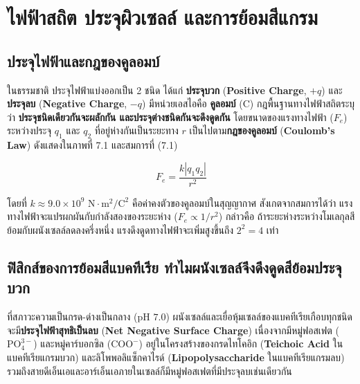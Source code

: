 \chapter{ไฟฟ้าสถิต ประจุผิวเซลล์ และการย้อมสีแกรม}

\section{ประจุไฟฟ้าและกฎของคูลอมบ์}


ในธรรมชาติ ประจุไฟฟ้าแบ่งออกเป็น 2 ชนิด ได้แก่ \textbf{ประจุบวก} (\textbf{Positive Charge}, $+q$) และ\textbf{ประจุลบ} (\textbf{Negative Charge}, $-q$) มีหน่วยเอสไอคือ \textbf{คูลอมบ์} ($\text{C}$) กฎพื้นฐานทางไฟฟ้าสถิตระบุว่า \textbf{ประจุชนิดเดียวกันจะผลักกัน และประจุต่างชนิดกันจะดึงดูดกัน} โดยขนาดของแรงทางไฟฟ้า ($F_e$) ระหว่างประจุ $q_1$ และ $q_2$ ที่อยู่ห่างกันเป็นระยะทาง $r$ เป็นไปตาม\textbf{กฎของคูลอมบ์} (\textbf{Coulomb's Law}) ดังแสดงใน\mbox{ภาพที่} 7.1 และสมการที่ (7.1)

\begin{equation}
    F_e = \frac{k |q_1 q_2|}{r^2}
\end{equation}

โดยที่ $k \approx 9.0 \times 10^9\text{ N}\cdot\text{m}^2/\text{C}^2$ คือค่าคงตัวของคูลอมบ์ในสุญญากาศ สังเกตจากสมการได้ว่า แรงทางไฟฟ้าจะแปรผกผันกับกำลังสองของระยะห่าง ($F_e \propto 1/r^2$) กล่าวคือ ถ้าระยะห่างระหว่างโมเลกุลสีย้อมกับผนังเซลล์ลดลงครึ่งหนึ่ง แรงดึงดูดทางไฟฟ้าจะเพิ่มสูงขึ้นถึง $2^2 = 4$ เท่า

\section{ฟิสิกส์ของการย้อมสีแบคทีเรีย ทำไมผนังเซลล์จึงดึงดูดสีย้อมประจุบวก}


ที่สภาวะความเป็นกรด-ด่างเป็นกลาง ($\text{pH } 7.0$) ผนังเซลล์และเยื่อหุ้มเซลล์ของแบคทีเรียเกือบทุกชนิดจะมี\textbf{ประจุไฟฟ้าสุทธิเป็นลบ} (\textbf{Net Negative Surface Charge}) เนื่องจากมีหมู่ฟอสเฟต ($\text{PO}_4^{3-}$) และหมู่คาร์บอกซิล ($\text{COO}^-$) อยู่ในโครงสร้างของกรดไทโคอิก (\textbf{Teichoic Acid} ในแบคทีเรียแกรมบวก) และลิโพพอลิแซ็กคาไรด์ (\textbf{Lipopolysaccharide} ในแบคทีเรียแกรมลบ) รวมถึงสายดีเอ็นเอและอาร์เอ็นเอภายในเซลล์ก็มีหมู่ฟอสเฟตที่มีประจุลบเช่นเดียวกัน

